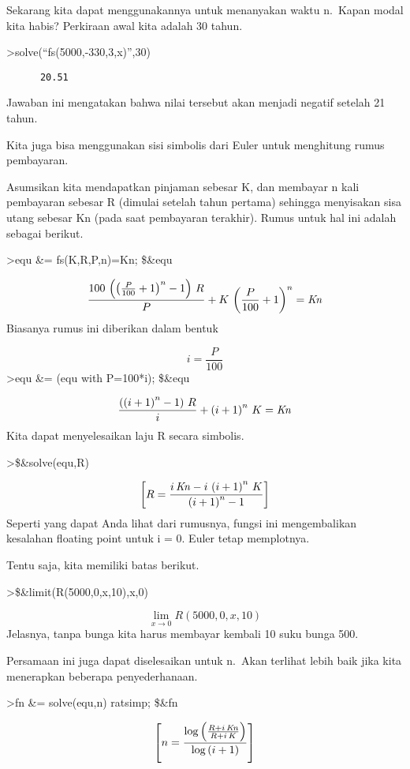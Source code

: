 \documentclass[
]{book}
\begin{document}
Sekarang kita dapat menggunakannya untuk menanyakan waktu n.~Kapan modal kita habis? Perkiraan awal kita adalah 30 tahun.

\textgreater solve(``fs(5000,-330,3,x)'',30)

\begin{verbatim}
      20.51 
\end{verbatim}

Jawaban ini mengatakan bahwa nilai tersebut akan menjadi negatif setelah 21 tahun.

Kita juga bisa menggunakan sisi simbolis dari Euler untuk menghitung rumus pembayaran.

Asumsikan kita mendapatkan pinjaman sebesar K, dan membayar n kali pembayaran sebesar R (dimulai setelah tahun pertama) sehingga menyisakan sisa utang sebesar Kn (pada saat pembayaran terakhir). Rumus untuk hal ini adalah sebagai berikut.

\textgreater equ \&= fs(K,R,P,n)=Kn; \$\&equ

\[\frac{100\,\left(\left(\frac{P}{100}+1\right)^{n}-1\right)\,R}{P}+K
 \,\left(\frac{P}{100}+1\right)^{n}={\it Kn}\]Biasanya rumus ini diberikan dalam bentuk

\[i = \frac{P}{100}\]\textgreater equ \&= (equ with P=100*i); \$\&equ

\[\frac{\left(\left(i+1\right)^{n}-1\right)\,R}{i}+\left(i+1\right)^{
 n}\,K={\it Kn}\]Kita dapat menyelesaikan laju R secara simbolis.

\textgreater\$\&solve(equ,R)

\[\left[ R=\frac{i\,{\it Kn}-i\,\left(i+1\right)^{n}\,K}{\left(i+1
 \right)^{n}-1} \right] \]Seperti yang dapat Anda lihat dari rumusnya, fungsi ini mengembalikan kesalahan floating point untuk i = 0. Euler tetap memplotnya.

Tentu saja, kita memiliki batas berikut.

\textgreater\$\&limit(R(5000,0,x,10),x,0)

\[\lim_{x\rightarrow 0}{R\left(5000 , 0 , x , 10\right)}\]Jelasnya, tanpa bunga kita harus membayar kembali 10 suku bunga 500.

Persamaan ini juga dapat diselesaikan untuk n.~Akan terlihat lebih baik jika kita menerapkan beberapa penyederhanaan.

\textgreater fn \&= solve(equ,n) \textbar{} ratsimp; \$\&fn

\[\left[ n=\frac{\log \left(\frac{R+i\,{\it Kn}}{R+i\,K}\right)}{
 \log \left(i+1\right)} \right] \]

\backmatter
\end{document}
